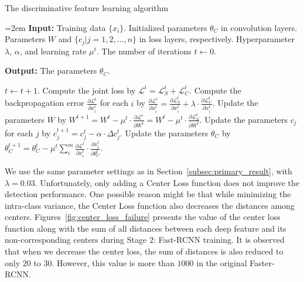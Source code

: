 \documentclass[a4paper]{article}
\begin{document}
\begin{algorithm}[H]
\caption{The discriminative feature learning algorithm}
\hangindent=2em
\textbf{Input:} Training data $\{x_i\}$. Initialized parameters $\theta_C$ in convolution layers. Parameters $W$ and $\{c_j | j = 1, 2, \dots, n\}$ in loss layers, respectively. Hyperparameter $\lambda$, $\alpha$, and learning rate $\mu^t$. The number of iterations $t \gets 0$.

\textbf{Output:} The parameters $\theta_C$.
\begin{algorithmic}[1]
\STATE $t \gets t + 1$.
\STATE Compute the joint loss by $\mathcal{L}^t = \mathcal{L}_S^t + \mathcal{L}_C^t$.
\STATE Compute the backpropagation error $\frac{\partial \mathcal{L}^t}{\partial x_i^t}$ for each $i$ by $\frac{\partial \mathcal{L}^t}{\partial  x_i^t} = \frac{\partial \mathcal{L}^t_S}{\partial x_i^t} + \lambda \cdot \frac{\partial \mathcal{L}_C^t}{\partial x_i^t}$.
\STATE Update the parameters $W$ by $W^{t+1} = W^t - \mu^t \cdot \frac{\partial \mathcal{L}^t}{\partial W^t} = W^t - \mu^t \cdot \frac{\partial \mathcal{L}^t_S}{\partial W^t}$.
\STATE Update the parameters $c_j$ for each $j$ by $c_j^{t+1} = c_j^t - \alpha \cdot \Delta c^t_j$.
\STATE Update the parameters $\theta_C$ by $\theta_C^{t+1} = \theta_C^t - \mu^t \sum_i^m \frac{\partial \mathcal{L}^t}{\partial x_i^t} \cdot \frac{\partial x_i^t}{\partial \theta^t_C}.$
\ENDWHILE
\end{algorithmic}
\end{algorithm}


We use the same parameter settings as in Section~\ref{subsec:primary_result}, with $\lambda = 0.03$. Unfortunately, only adding a Center Loss function does not improve the detection performance. One possible reason might be that while minimizing the intra-class variance, the Center Loss function also decreases the distances among centers. Figures~\ref{fig:center_loss_failure} presents the value of the center loss function along with the sum of all distances between each deep feature and its non-corresponding centers during Stage $2$: Fast-RCNN training. It is observed that when we decrease the center loss, the sum of distances is also reduced to only $20$ to $30$. However, this value is more than $1000$ in the original Faster-RCNN. 
\end{document}
